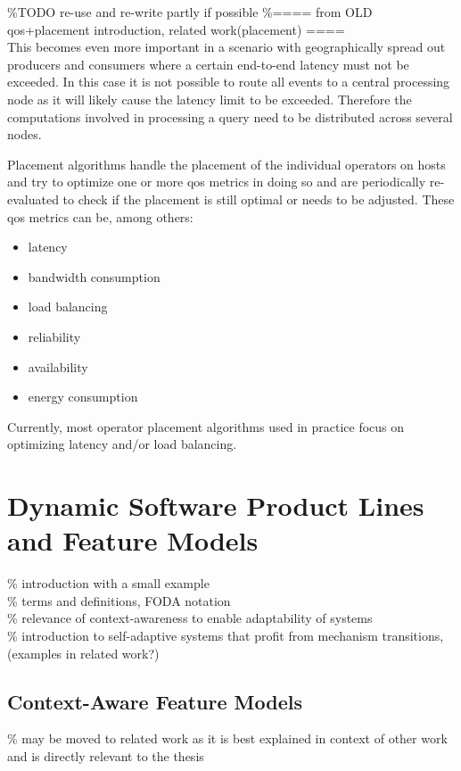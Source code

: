 \%TODO re-use and re-write partly if possible
\%==== from OLD \gls{qos}+placement introduction, related work(placement) ====\\
This becomes even more important in a scenario with geographically spread out producers and consumers where a certain end-to-end latency must not be exceeded. In this case it is not possible to route all events to a central processing node as it will likely cause the latency limit to be exceeded. Therefore the computations involved in processing a query need to be distributed across several nodes.

Placement algorithms handle the placement of the individual operators on hosts and try to optimize one or more \gls{qos} metrics in doing so and are periodically re-evaluated to check if the placement is still optimal or needs to be adjusted. 
These \gls{qos} metrics can be, among others: 
\begin{itemize}
\item latency 
\item bandwidth consumption
\item load balancing
\item reliability
\item availability
\item energy consumption
\end{itemize}

Currently, most operator placement algorithms used in practice focus on optimizing latency and/or load balancing. 



\section{Dynamic Software Product Lines and Feature Models}
\% introduction with a small example \\
\% terms and definitions, FODA notation \\
\% relevance of context-awareness to enable adaptability of systems \\
\% introduction to self-adaptive systems that profit from mechanism transitions, (examples in related work?)

\subsection{Context-Aware Feature Models} 
\% may be moved to related work as it is best explained in context of other work and is directly relevant to the thesis

